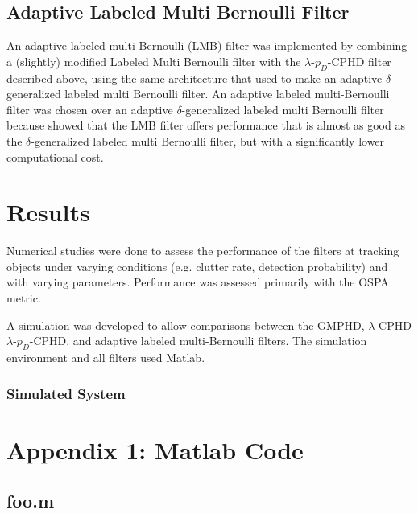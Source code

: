 \documentclass{article}
\begin{document}
\subsection*{Adaptive Labeled Multi Bernoulli Filter}
An adaptive labeled multi-Bernoulli (LMB) filter was implemented by combining a (slightly) modified Labeled Multi Bernoulli\cite{lmb} filter with the $\lambda$-$p_D$-CPHD filter described above, using the same architecture that \cite{adaptive_dglmb} used to make an adaptive $\delta$-generalized labeled multi Bernoulli filter. An adaptive labeled multi-Bernoulli filter was chosen over an adaptive $\delta$-generalized labeled multi Bernoulli filter because \cite{lmb} showed that the LMB filter offers performance that is almost as good as the $\delta$-generalized labeled multi Bernoulli filter, but with a significantly lower computational cost.

\section*{Results}
Numerical studies were done to assess the performance of the filters at tracking objects under varying conditions (e.g. clutter rate, detection probability) and with varying parameters. Performance was assessed primarily with the OSPA\cite{OSPA} metric.

A simulation was developed to allow comparisons between the GMPHD, $\lambda$-CPHD $\lambda$-$p_D$-CPHD, and adaptive labeled multi-Bernoulli filters. The simulation environment and all filters used Matlab.
\subsubsection*{Simulated System}


\clearpage
\pagebreak
\printbibliography

\section*{Appendix 1: Matlab Code}
\subsection*{foo.m}
\begin{lstlisting}[language=Matlab]
\end{lstlisting}
\end{document}
